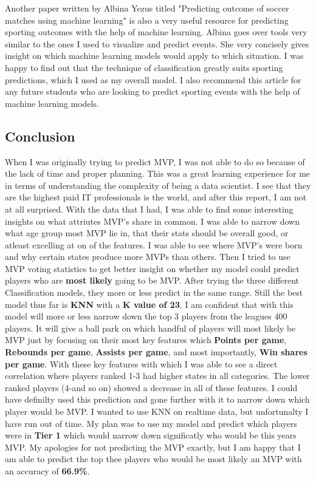 \documentclass[11pt]{article}
\begin{document}
Another paper written by Albina Yezus titled "Predicting outcome of
soccer matches using machine learning" is also a very useful resource
for predicting sporting outcomes with the help of machine learning.
Albina goes over tools very similar to the ones I used to visualize and
predict events. She very concisely gives insight on which machine
learning models would apply to which situation. I was happy to find out
that the technique of classification greatly suits sporting predictions,
which I used as my overall model. I also recommend this article for any
future students who are looking to predict sporting events with the help
of machine learning models.

    \subsection{Conclusion}\label{conclusion}

When I was originally trying to predict MVP, I was not able to do so
because of the lack of time and proper planning. This was a great
learning experience for me in terms of understanding the complexity of
being a data scientist. I see that they are the highest paid IT
professionals is the world, and after this report, I am not at all
surprised. With the data that I had, I was able to find some interesting
insights on what attriutes MVP's share in common. I was able to narrow
down what age group most MVP lie in, that their stats should be overall
good, or atleast excelling at on of the features. I was able to see
where MVP's were born and why certain states produce more MVPs than
others. Then I tried to use MVP voting statistics to get better insight
on whether my model could predict players who are \textbf{most likely}
going to be MVP. After trying the three different Classification models,
they more or less predict in the same range. Still the best model thus
far is \textbf{KNN} with a \textbf{K value of 23}. I am confident that
with this model will more or less narrow down the top 3 players from the
leagues 400 players. It will give a ball park on which handful of
players will most likely be MVP just by focusing on their most key
features which \textbf{Points per game}, \textbf{Rebounds per game},
\textbf{Assists per game}, and most importantly, \textbf{Win shares per
game}. With these key features with which I was able to see a direct
correlation where players ranked 1-3 had higher states in all
categories. The lower ranked players (4-and so on) showed a decrease in
all of these features. I could have definilty used this prediction and
gone further with it to narrow down which player would be MVP. I wanted
to use KNN on realtime data, but unfortunalty I have run out of time. My
plan was to use my model and predict which players were in \textbf{Tier
1} which would narrow down significatly who would be this years MVP. My
apologies for not predicting the MVP exactly, but I am happy that I am
able to predict the top thee players who would be most likely an MVP
with an accuracy of \textbf{66.9\%}.
\end{document}
